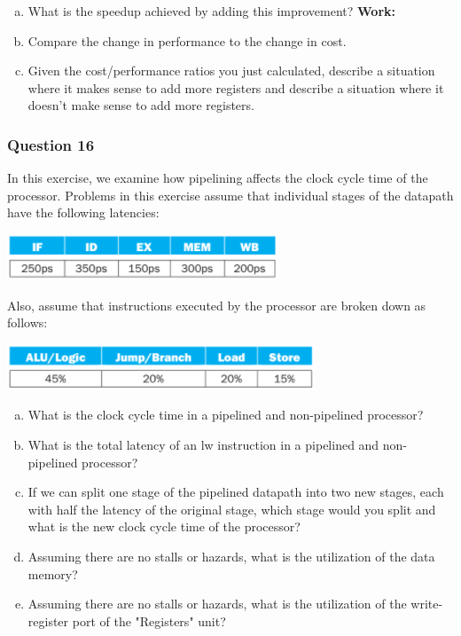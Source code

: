 \documentclass[11pt]{article}
\begin{document}
\begin{enumerate}[(a)]
    \item What is the speedup achieved by adding this improvement?
    \textbf{Work:}
        
    \item Compare the change in performance to the change in cost.
    \item Given the cost/performance ratios you just calculated, describe a situation where it makes sense to add more registers and describe a situation where it doesn't make sense to add more registers.
\end{enumerate}


\setcounter{subsubsection}{15}
\subsubsection{Question 16}
In this exercise, we examine how pipelining affects the clock cycle time of the processor. Problems in this exercise assume that individual stages of the datapath have the following latencies:
\begin{center}\includegraphics[scale=0.68]{q16_image1}\\\end{center}
Also, assume that instructions executed by the processor are broken down as follows:
\begin{center}\includegraphics[scale=0.6]{q16_image2}\\\end{center}

\begin{enumerate}[(a)]
    \item What is the clock cycle time in a pipelined and non-pipelined processor?
    \item What is the total latency of an lw instruction in a pipelined and non-pipelined processor?
    \item If we can split one stage of the pipelined datapath into two new stages, each with half the latency of the original stage, which stage would you split and what is the new clock cycle time of the processor?
    \item Assuming there are no stalls or hazards, what is the utilization of the data memory?
    \item Assuming there are no stalls or hazards, what is the utilization of the write-register port of the "Registers" unit?

\end{enumerate}
\end{document}
